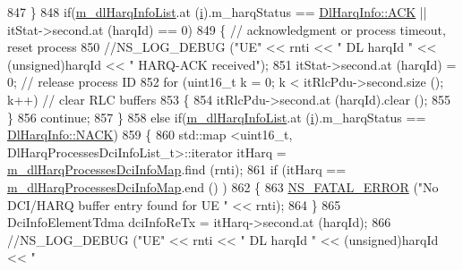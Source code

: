 \begin{DoxyCode}
847                         \}
848                         \textcolor{keywordflow}{if}(\hyperlink{classns3_1_1MmWaveFlexTtiMaxWeightMacScheduler_afcc7ec068937dbf27338c5ed6a7a2f77}{m\_dlHarqInfoList}.at (\hyperlink{bernuolliDistribution_8m_a6f6ccfcf58b31cb6412107d9d5281426}{i}).m\_harqStatus == 
      \hyperlink{structns3_1_1DlHarqInfo_a922d2bc13ae01f93cde1a8b4bfccad14a8d3ab99ad8902cfbc5929336966de3ef}{DlHarqInfo::ACK} || itStat->second.at (harqId) == 0)
849                         \{ \textcolor{comment}{// acknowledgment or process timeout, reset process}
850                                 \textcolor{comment}{//NS\_LOG\_DEBUG ("UE" << rnti << " DL harqId " << (unsigned)harqId << "
       HARQ-ACK received");}
851                                 itStat->second.at (harqId) = 0;    \textcolor{comment}{// release process ID}
852                                 \textcolor{keywordflow}{for} (uint16\_t k = 0; k < itRlcPdu->second.size (); k++)         \textcolor{comment}{// clear
       RLC buffers}
853                                 \{
854                                         itRlcPdu->second.at (harqId).clear ();
855                                 \}
856                                 \textcolor{keywordflow}{continue};
857                         \}
858                         \textcolor{keywordflow}{else} \textcolor{keywordflow}{if}(\hyperlink{classns3_1_1MmWaveFlexTtiMaxWeightMacScheduler_afcc7ec068937dbf27338c5ed6a7a2f77}{m\_dlHarqInfoList}.at (\hyperlink{bernuolliDistribution_8m_a6f6ccfcf58b31cb6412107d9d5281426}{i}).m\_harqStatus == 
      \hyperlink{structns3_1_1DlHarqInfo_a922d2bc13ae01f93cde1a8b4bfccad14ae0560b883a5e22a4d4c40ac562e80374}{DlHarqInfo::NACK})
859                         \{
860                                 std::map <uint16\_t, DlHarqProcessesDciInfoList\_t>::iterator itHarq = 
      \hyperlink{classns3_1_1MmWaveFlexTtiMaxWeightMacScheduler_ac833e86e5419d19a445f1e359d06486e}{m\_dlHarqProcessesDciInfoMap}.find (rnti);
861                                 \textcolor{keywordflow}{if} (itHarq == \hyperlink{classns3_1_1MmWaveFlexTtiMaxWeightMacScheduler_ac833e86e5419d19a445f1e359d06486e}{m\_dlHarqProcessesDciInfoMap}.end ()
      )
862                                 \{
863                                         \hyperlink{group__fatal_ga5131d5e3f75d7d4cbfd706ac456fdc85}{NS\_FATAL\_ERROR} (\textcolor{stringliteral}{"No DCI/HARQ buffer entry found for
       UE "} << rnti);
864                                 \}
865                                 DciInfoElementTdma dciInfoReTx = itHarq->second.at (harqId);
866                                 \textcolor{comment}{//NS\_LOG\_DEBUG ("UE" << rnti << " DL harqId " << (unsigned)harqId << "
}
\end{DoxyCode}
